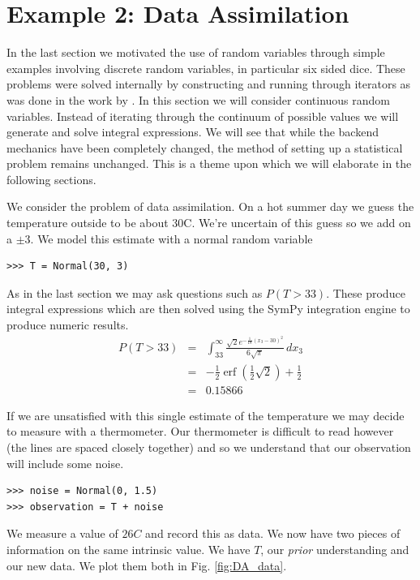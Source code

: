 \section{Example 2: Data Assimilation}

In the last section we motivated the use of random variables through simple examples involving discrete random variables, in particular six sided dice. These problems were solved internally by constructing and running through iterators as was done in the work by \cite{Erwig2006}. In this section we will consider continuous random variables. Instead of iterating through the continuum of possible values we will generate and solve integral expressions. We will see that while the
backend mechanics have been completely changed, the method of setting up a statistical problem remains unchanged. This is a theme upon which we will elaborate in the following sections. 

We consider the problem of data assimilation. On a hot summer day we guess the temperature outside to be about 30C. We're uncertain of this guess so we add on a $\pm3$. We model this estimate with a normal random variable

\begin{lstlisting}
>>> T = Normal(30, 3)
\end{lstlisting}

As in the last section we may ask questions such as $P(T>33)$. These produce integral expressions which are then solved using the SymPy integration engine to produce numeric results.
\begin{eqnarray*}
P(T>33) & = & \int_{33}^{\infty} \frac{\sqrt{2} e^{- \frac{1}{18} \left(x_{3} -30\right)^{2}}}{6 \sqrt{\pi}}\, dx_{3} \\
& = & - \frac{1}{2} \operatorname{erf}{\left (\frac{1}{2} \sqrt{2} \right )} + \frac{1}{2} \\
& = & 0.15866
\end{eqnarray*}

If we are unsatisfied with this single estimate of the temperature we may decide to measure with a thermometer. Our thermometer is difficult to read however (the lines are spaced closely together) and so we understand that our observation will include some noise. 

\begin{lstlisting}
>>> noise = Normal(0, 1.5)
>>> observation = T + noise
\end{lstlisting}

We measure a value of $26C$ and record this as data. We now have two pieces of information on the same intrinsic value. We have $T$, our \textit{prior} understanding and our new data. We plot them both in Fig. \ref{fig:DA_data}. 

